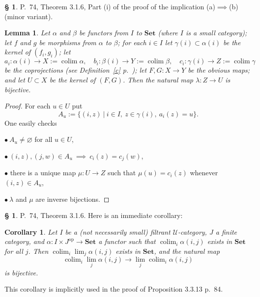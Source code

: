 \documentclass[12pt]{article}
\newtheorem{lem}[thm]{Lemma}
\newtheorem{cor}[thm]{Corollary}
\theoremstyle{remark}
\theoremstyle{definition}
\newtheorem{s}[thm]{\S}
\newcommand{\bu}{\bullet}
\newcommand{\U}{\mathcal U}
\newcommand{\Set}{\mathbf{Set}}
\newcommand{\mv}{ (minor variant)}
\DeclareMathOperator*{\coli}{colim}
\DeclareMathOperator{\op}{op}
\begin{document}
\begin{s} 
P.~74, Theorem 3.1.6, Part (i) of the proof of the implication (a)$\implies$(b)\mv. 
%
\begin{lem} 
Let $\alpha$ and $\beta$ be functors from $I$ to $\Set$ (where $I$ is a small category); let $f$ and $g$ be morphisms from $\alpha$ to $\beta$; for each $i\in I$ let $\gamma(i)\subset\alpha(i)$ be the kernel of $(f_i,g_i)$; let 
$$
a_i:\alpha(i)\to X:=\coli\alpha,\quad 
b_i:\beta(i)\to Y:=\coli\beta,\quad 
c_i:\gamma(i)\to Z:=\coli\gamma
$$ 
be the coprojections (see Definition~\ref{c} p.~\pageref{c}); let $F,G:X\to Y$ be the obvious maps; and let $U\subset X$ be the kernel of $(F,G)$. Then the natural map $\lambda:Z\to U$ is bijective.
\end{lem}
%
\begin{proof}
For each $u\in U$ put 
$$
A_u:=\{(i,z)\ |\ i\in I,\ z\in\gamma(i),\ a_i(z)=u\}.
$$ 
One easily checks 

\noindent$\bu\ A_u\ne\varnothing$ for all $u\in U$,

\noindent$\bu\ (i,z),(j,w)\in A_u\ \implies\ c_i(z)=c_j(w)$, 

\noindent$\bu$ there is a unique map $\mu:U\to Z$ such that $\mu(u)=c_i(z)$ whenever $(i,z)\in A_u$,

\noindent$\bu\ \lambda$ and $\mu$ are inverse bijections.
\end{proof}
\end{s}
%
%
\begin{s} 
P.~74, Theorem 3.1.6. Here is an immediate corollary: 
%
\begin{cor}\label{316}
Let $I$ be a (not necessarily small) filtrant $\U$-category, $J$ a finite category, and $\alpha:I\times J^{\op}\to\Set$ a functor such that $\coli_i\alpha(i,j)$ exists in $\Set$ for all $j$. Then $\coli_i\lim_j\alpha(i,j)$ exists in $\Set$, and the natural map 
$$
\coli_i\lim_j\alpha(i,j)\to
\lim_j\coli_i\alpha(i,j)
$$ 
is bijective. 
\end{cor}
%
This corollary is implicitly used in the proof of Proposition 3.3.13 p.~84.
\end{s}
%
%
\end{document}

